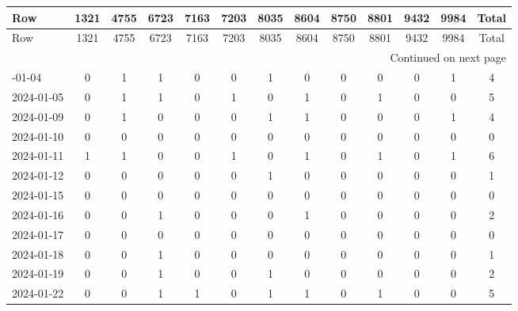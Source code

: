 \documentclass[dvipdfmx,oneside]{article}
\begin{document}
\begingroup
\footnotesize
\begin{longtable}{lcccccccccccc}
\toprule
               Row &  1321 &  4755 &  6723 &  7163 &  7203 &  8035 &  8604 &  8750 &  8801 &  9432 &  9984 &  Total \\
\midrule
\endfirsthead

\toprule
               Row &  1321 &  4755 &  6723 &  7163 &  7203 &  8035 &  8604 &  8750 &  8801 &  9432 &  9984 &  Total \\
\midrule
\endhead
\midrule
\multicolumn{13}{r}{{Continued on next page}} \\
\midrule
\endfoot

\bottomrule
\endlastfoot
        2024-01-04 &     0 &     1 &     1 &     0 &     0 &     1 &     0 &     0 &     0 &     0 &     1 &      4 \\
        2024-01-05 &     0 &     1 &     1 &     0 &     1 &     0 &     1 &     0 &     1 &     0 &     0 &      5 \\
        2024-01-09 &     0 &     1 &     0 &     0 &     0 &     1 &     1 &     0 &     0 &     0 &     1 &      4 \\
        2024-01-10 &     0 &     0 &     0 &     0 &     0 &     0 &     0 &     0 &     0 &     0 &     0 &      0 \\
        2024-01-11 &     1 &     1 &     0 &     0 &     1 &     0 &     1 &     0 &     1 &     0 &     1 &      6 \\
        2024-01-12 &     0 &     0 &     0 &     0 &     0 &     1 &     0 &     0 &     0 &     0 &     0 &      1 \\
        2024-01-15 &     0 &     0 &     0 &     0 &     0 &     0 &     0 &     0 &     0 &     0 &     0 &      0 \\
        2024-01-16 &     0 &     0 &     1 &     0 &     0 &     0 &     1 &     0 &     0 &     0 &     0 &      2 \\
        2024-01-17 &     0 &     0 &     0 &     0 &     0 &     0 &     0 &     0 &     0 &     0 &     0 &      0 \\
        2024-01-18 &     0 &     0 &     1 &     0 &     0 &     0 &     0 &     0 &     0 &     0 &     0 &      1 \\
        2024-01-19 &     0 &     0 &     1 &     0 &     0 &     1 &     0 &     0 &     0 &     0 &     0 &      2 \\
        2024-01-22 &     0 &     0 &     1 &     1 &     0 &     1 &     1 &     0 &     1 &     0 &     0 &      5 \\

\end{longtable}
\end{document}
